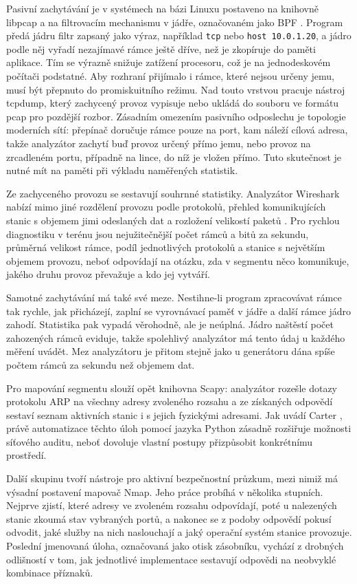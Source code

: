 Pasivní zachytávání je v systémech na bázi Linuxu postaveno na knihovně libpcap a na filtrovacím mechanismu v jádře, označovaném jako BPF \cite{mccanne1993}. Program předá jádru filtr zapsaný jako výraz, například \texttt{tcp} nebo \texttt{host 10.0.1.20}, a jádro podle něj vyřadí nezajímavé rámce ještě dříve, než je zkopíruje do paměti aplikace. Tím se výrazně snižuje zatížení procesoru, což je na jednodeskovém počítači podstatné. Aby rozhraní přijímalo i rámce, které nejsou určeny jemu, musí být přepnuto do promiskuitního režimu. Nad touto vrstvou pracuje nástroj tcpdump, který zachycený provoz vypisuje nebo ukládá do souboru ve formátu pcap pro pozdější rozbor. Zásadním omezením pasivního odposlechu je topologie moderních sítí: přepínač doručuje rámce pouze na port, kam náleží cílová adresa, takže analyzátor zachytí buď provoz určený přímo jemu, nebo provoz na zrcadleném portu, případně na lince, do níž je vložen přímo. Tuto skutečnost je nutné mít na paměti při výkladu naměřených statistik.

Ze zachyceného provozu se sestavují souhrnné statistiky. Analyzátor Wireshark nabízí mimo jiné rozdělení provozu podle protokolů, přehled komunikujících stanic s objemem jimi odeslaných dat a rozložení velikostí paketů \cite{wiresharkstat}. Pro rychlou diagnostiku v terénu jsou nejužitečnější počet rámců a bitů za sekundu, průměrná velikost rámce, podíl jednotlivých protokolů a stanice s největším objemem provozu, neboť odpovídají na otázku, zda v segmentu něco komunikuje, jakého druhu provoz převažuje a kdo jej vytváří.

Samotné zachytávání má také své meze. Nestihne-li program zpracovávat rámce tak rychle, jak přicházejí, zaplní se vyrovnávací paměť v jádře a další rámce jádro zahodí. Statistika pak vypadá věrohodně, ale je neúplná. Jádro naštěstí počet zahozených rámců eviduje, takže spolehlivý analyzátor má tento údaj u každého měření uvádět. Mez analyzátoru je přitom stejně jako u generátoru dána spíše počtem rámců za sekundu než objemem dat.

Pro mapování segmentu slouží opět knihovna Scapy: analyzátor rozešle dotazy protokolu ARP na všechny adresy zvoleného rozsahu a ze získaných odpovědí sestaví seznam aktivních stanic i s jejich fyzickými adresami. Jak uvádí Carter \cite{carter2024}, právě automatizace těchto úloh pomocí jazyka Python zásadně rozšiřuje možnosti síťového auditu, neboť dovoluje vlastní postupy přizpůsobit konkrétnímu prostředí.

Další skupinu tvoří nástroje pro aktivní bezpečnostní průzkum, mezi nimiž má výsadní postavení mapovač Nmap. Jeho práce probíhá v několika stupních. Nejprve zjistí, které adresy ve zvoleném rozsahu odpovídají, poté u nalezených stanic zkoumá stav vybraných portů, a nakonec se z podoby odpovědí pokusí odvodit, jaké služby na nich naslouchají a jaký operační systém stanice provozuje. Poslední jmenovaná úloha, označovaná jako otisk zásobníku, vychází z drobných odlišností v tom, jak jednotlivé implementace sestavují odpovědi na neobvyklé kombinace příznaků.

